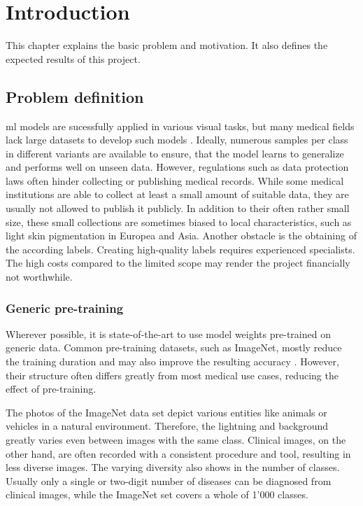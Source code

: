 \chapter{Introduction}
This chapter explains the basic problem and motivation. It also defines the expected results of this project.



\section{Problem definition}

\gls{ml} models are sucessfully applied in various visual tasks, but many medical fields lack large datasets to develop such models \autocite{castro2019}. 
Ideally, numerous samples per class in different variants are available to ensure, that the model learns to generalize and performs well on unseen data. 
However, regulations such as data protection laws often hinder collecting or publishing medical records. 
While some medical institutions are able to collect at least a small amount of suitable data, they are usually not allowed to publish it publicly. 
In addition to their often rather small size, these small collections are sometimes biased to local characteristics, such as light skin pigmentation in Europea and Asia.
Another obstacle is the obtaining of the according labels. Creating high-quality labels requires experienced specialists. 
The high costs compared to the limited scope may render the project financially not worthwhile.

\subsection{Generic pre-training}
Wherever possible, it is state-of-the-art to use model weights pre-trained on generic data. 
Common pre-training datasets, such as ImageNet, mostly reduce the training duration and may also improve the resulting accuracy \autocite{deng2009}.
However, their structure often differs greatly from most medical use cases, reducing the effect of pre-training. 

The photos of the ImageNet data set depict various entities like animals or vehicles in a natural environment. 
Therefore, the lightning and background greatly varies even between images with the same class.
Clinical images, on the other hand, are often recorded with a consistent procedure and tool, resulting in less diverse images.
The varying diversity also shows in the number of classes. 
Usually only a single or two-digit number of diseases can be diagnosed from clinical images, while the ImageNet set covers a whole of 1'000 classes.

